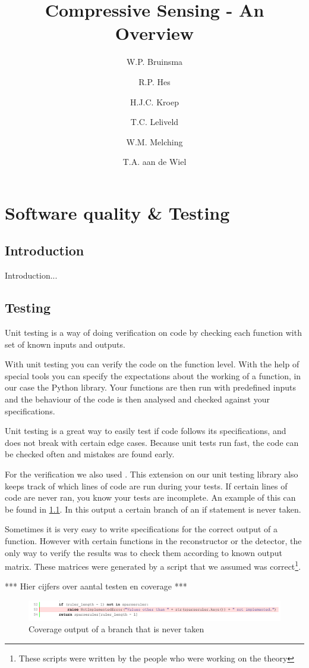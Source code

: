 \documentclass[a4paper, openany, oneside]{memoir}
\title{Compressive Sensing - An Overview}
\author{W.P. Bruinsma \and R.P. Hes \and H.J.C. Kroep \and T.C. Leliveld \and W.M. Melching \and T.A. aan de Wiel}
\begin{document}
\chapter{Software quality \& Testing}
\section{Introduction}
Introduction...

\section{Testing}
Unit testing is a way of doing verification on code by checking each function with set of known inputs and outputs.

With unit testing you can verify the code on the function level. With the help of special tools you can specify the expectations about the working of a function, in our case the Python  library. Your functions are then run with predefined inputs and the behaviour of the code is then analysed and checked against your specifications.

Unit testing is a great way to easily test if code follows its specifications, and does not break with certain edge cases. Because unit tests run fast, the code can be checked often and mistakes are found early.

For the verification we also used . This extension on our unit testing library also keeps track of which lines of code are run during your tests. If certain lines of code are never ran, you know your tests are incomplete. An example of this can be found in \cref{fig:coverage_branch}. In this output a certain branch of an if statement is never taken.

Sometimes it is very easy to write specifications for the correct output of a function. However with certain functions in the reconstructor or the detector, the only way to verify the results was to check them according to known output matrix. These matrices were generated by a \matlab{} script that we assumed was correct\footnote{These \matlab{} scripts were written by the people who were working on the theory}.

*** Hier cijfers over aantal testen en coverage ***

\begin{figure}[h]
    \centering
    \includegraphics[width=\textwidth]{fig_branch_coverage.pdf}
    \caption{Coverage output of a branch that is never taken}
    \label{fig:coverage_branch}
\end{figure}
\end{document}
